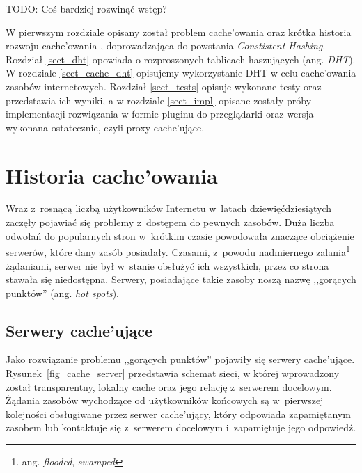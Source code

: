 \documentclass[a4paper,11pt]{scrartcl}
\newcommand{\s}{ }
\newcommand{\kesz}{cache}
\newcommand{\keszujace}{cache'ujące}
\newcommand{\keszujacy}{cache'ujący}
\newcommand{\keszowania}{cache'owania}
\begin{document}
TODO: Coś bardziej rozwinąć wstęp?

W pierwszym rozdziale opisany został problem \keszowania\s oraz krótka historia rozwoju \keszowania\s, doprowadzająca do powstania \textit{Constistent Hashing}. Rozdział \ref{sect_dht} opowiada o rozproszonych tablicach haszujących (ang. \textit{DHT}). W rozdziale \ref{sect_cache_dht} opisujemy wykorzystanie DHT w celu \keszowania\s zasobów internetowych. Rozdział \ref{sect_tests} opisuje wykonane testy oraz przedstawia ich wyniki, a w rozdziale \ref{sect_impl} opisane zostały próby implementacji rozwiązania w formie pluginu do przeglądarki oraz wersja wykonana ostatecznie, czyli proxy \keszujace.

\section{Historia \keszowania}
Wraz z~rosnącą liczbą użytkowników Internetu w~latach dziewięćdziesiątych zaczęły pojawiać się problemy z~dostępem do pewnych zasobów.
Duża liczba odwołań do popularnych stron w~krótkim czasie powodowała znaczące obciążenie serwerów, które dany zasób posiadały.
Czasami, z~powodu nadmiernego zalania\footnote{ang. \textit{flooded}, \textit{swamped}} żądaniami, serwer nie był w~stanie obsłużyć ich wszystkich, przez co strona stawała się niedostępna. Serwery, posiadające takie zasoby noszą nazwę ,,gorących punktów'' (ang. \textit{hot spots}).

\subsection{Serwery \keszujace}\label{sect_cache}
Jako rozwiązanie problemu ,,gorących punktów'' pojawiły się serwery \keszujace. Rysunek~\ref{fig_cache_server} przedstawia schemat sieci, w której wprowadzony został transparentny, lokalny \kesz\s oraz jego relację z~serwerem docelowym. 
Żądania zasobów wychodzące od użytkowników końcowych są w~pierwszej kolejności obsługiwane przez serwer \keszujacy, który odpowiada zapamiętanym zasobem lub kontaktuje się z~serwerem docelowym i~zapamiętuje jego odpowiedź.
\end{document}
